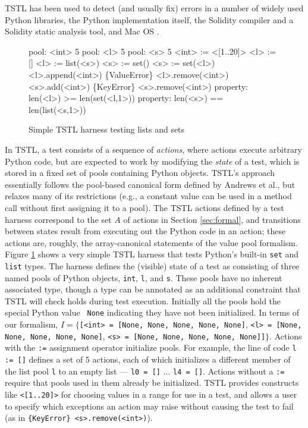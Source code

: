 TSTL has
been used to detect (and usually fix) errors in a number of widely
used Python libraries, the Python implementation itself, the Solidity
compiler and a Solidity static analysis tool, and Mac OS \cite{tstl}.

\begin{figure}
\begin{code}
pool: <int> 5
pool: <l> 5
pool: <s> 5
\vspace{0.1in}
<int> := <[1..20]>
<l> := []
<l> := list(<s>)
<s> := set()
<s> := set(<l>)
\vspace{0.1in}
<l>.append(<int>)
\{ValueError\} <l>.remove(<int>)
<s>.add(<int>)
\{KeyError\} <s>.remove(<int>)
\vspace{0.1in}
property: len(<l>) >= len(set(<l,1>))
property: len(<s>) == len(list(<s,1>))
\end{code}
\caption{Simple TSTL harness testing lists and sets}
\label{fig:simple}
\end{figure}

In TSTL, a test consists of a sequence of
\emph{actions}, where actions execute arbitrary Python code, but are
expected to work by modifying the \emph{state} of a test, which is
stored in a fixed set of pools containing Python objects.  TSTL's
approach essentially follows the pool-based canonical form defined by
Andrews et al., but relaxes many of its restrictions
(e.g., a constant value can be used in a method call without first
assigning it to a pool). The
TSTL actions defined by a test harness correspond to the set $A$ of
actions in Section \ref{sec:formal}, and transitions between states
result from executing out the Python code in an action; these actions
are, roughly, the array-canonical statements of the value pool formalism.  Figure
\ref{fig:simple} shows a very simple TSTL harness that tests Python's
built-in {\tt set} and {\tt list} types.  The harness defines the
(visible) state of a test as consisting of three named pools of Python
objects, {\tt int}, {\tt l}, and {\tt s}.  These pools have no
inherent associated type, though a type can be annotated as an
additional constraint that TSTL will check holds during test
execution.  Initially all the pools hold the special Python value {\tt
  None} indicating they have not been initialized.  In terms of our formalism,
$I = \{${\tt [<int> = [None, None, None, None, None]}, {\tt <l> =
  [None, None, None, None, None]}, {\tt <s> = [None, None, None, None,
  None]]}$\}$.  Actions with the {\tt :=} assignment operator
initialize pools.  For example, the line of code {\tt l := []} defines a set of 5
actions, each of which initializes a different member of the list pool
{\tt l} to an empty list --- {\tt l0 = []} ... {\tt l4 = []}.  Actions
without a {\tt :=} require that pools used in them already be
initialized.  TSTL provides constructs like {\tt <[1..20]>} for
choosing values in a range for use in a test, and allows a user to
specify which exceptions an action may raise without causing the test
to fail (as in {\tt \{KeyError\} <s>.remove(<int>)}).

